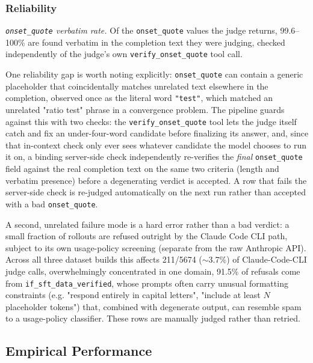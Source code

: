 \documentclass{article}
\begin{document}
\subsubsection{Reliability}
\label{sec:judge-reliability}

\emph{\texttt{onset\_quote} verbatim rate.} Of the \texttt{onset\_quote}
values the judge returns, 99.6--100\% are found verbatim in the completion
text they were judging, checked independently of the judge's own
\texttt{verify\_onset\_quote} tool call.

One reliability gap is worth noting explicitly: \texttt{onset\_quote} can
contain a generic placeholder that coincidentally matches unrelated text
elsewhere in the completion, observed once as the literal word
\texttt{"test"}, which matched an unrelated "ratio test" phrase in a
convergence problem. The pipeline guards against this with two checks: the
\texttt{verify\_onset\_quote} tool lets the judge itself catch and fix an
under-four-word candidate before finalizing its answer, and, since that
in-context check only ever sees whatever candidate the model chooses to run
it on, a binding server-side check independently re-verifies the
\emph{final} \texttt{onset\_quote} field against the real completion text on
the same two criteria (length and verbatim presence) before a degenerating
verdict is accepted. A row that fails the server-side check is re-judged
automatically on the next run rather than accepted with a bad
\texttt{onset\_quote}.

A second, unrelated failure mode is a hard error rather than a bad verdict:
a small fraction of rollouts are refused outright by the Claude Code CLI
path, subject to its own usage-policy screening (separate from the raw
Anthropic API). Across all three dataset builds this affects 211/5674
($\sim$3.7\%) of Claude-Code-CLI judge calls, overwhelmingly concentrated in
one domain, 91.5\% of refusals come from \texttt{if\_sft\_data\_verified},
whose prompts often carry unusual formatting constraints (e.g. "respond
entirely in capital letters", "include at least $N$ placeholder tokens")
that, combined with degenerate output, can resemble spam to a usage-policy
classifier. These rows are manually judged rather than retried.

\subsection{Empirical Performance}
\label{sec:empirical-performance}
\end{document}
